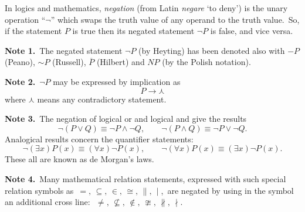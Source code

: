 \documentclass[12pt]{article}
\theoremstyle{definition}
\begin{document}
 

In logics and mathematics, {\em negation} (from Latin {\em negare} `to deny') is the unary operation ``$\lnot$'' which swaps the truth value of any operand to the  truth value.\, So, if the statement $P$ is true then its negated statement $\lnot P$ is false, and vice versa.

\textbf{Note 1.}\, The negated statement $\lnot P$ (by Heyting) has been denoted also with $-P$ (Peano), $\sim\! P$ (Russell), $\overline{P}$ (Hilbert) and $NP$ (by the Polish notation).

\textbf{Note 2.}\, $\lnot P$ may be expressed by implication as
$$P\to\curlywedge$$
where $\curlywedge$ means any contradictory statement.

\textbf{Note 3.}\, The negation of logical or and logical and give the results
$$\lnot(P\lor Q) \equiv \lnot P \land \lnot Q, \qquad 
  \lnot(P\land Q) \equiv \lnot P \lor \lnot Q.$$
Analogical results concern the quantifier statements:
$$\lnot (\exists x)P(x) \equiv (\forall x)\lnot P(x), \qquad
  \lnot (\forall x)P(x) \equiv (\exists x)\lnot P(x).$$
These all are known as de Morgan's laws.

\textbf{Note 4.}\, Many mathematical relation statements, expressed with such special relation symbols as\, $=,\, \subseteq,\, \in,\, \cong,\, \parallel,\, \mid$,\, are negated by using in the symbol an additional cross line:\,\,
 $\neq,\, \nsubseteq,\, \notin,\, \ncong,\, \nparallel,\, \nmid$.
\end{document}
